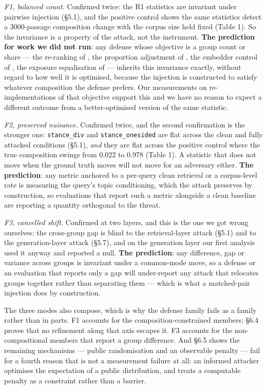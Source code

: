 \documentclass[authoryear,review,3p,times]{elsarticle}
\begin{document}
\emph{F1, balanced count.} Confirmed twice: the R1 statistics are invariant under pairwise injection (§5.1), and the positive control shows the same statistics detect a 3000-passage composition change with the corpus size held fixed (Table 1). So the invariance is a property of the attack, not the instrument. \textbf{The prediction for work we did not run}: any defense whose objective is a group count or share --- the re-ranking of \citeauthor{zhao2026}, the proportion adjustment of \citeauthor{wu2025}, the embedder control of \citeauthor{kim2025a}, the exposure equalisation of \citeauthor{kim2025b} --- inherits this invariance exactly, without regard to how well it is optimised, because the injection is constructed to satisfy whatever composition the defense prefers. Our measurements on re-implementations of that objective support this and we have no reason to expect a different outcome from a better-optimised version of the same statistic.

\emph{F2, preserved nuisance.} Confirmed twice, and the second confirmation is the stronger one: \texttt{stance\_div} and \texttt{stance\_onesided} are flat across the clean and fully attacked conditions (§5.1), \emph{and} they are flat across the positive control where the true composition swings from 0.022 to 0.978 (Table 1). A statistic that does not move when the ground truth moves will not move for an adversary either. \textbf{The prediction}: any metric anchored to a per-query clean retrieval or a corpus-level rate is measuring the query's topic conditioning, which the attack preserves by construction, so evaluations that report such a metric alongside a clean baseline are reporting a quantity orthogonal to the threat.

\emph{F3, cancelled shift.} Confirmed at two layers, and this is the one we got wrong ourselves: the cross-group gap is blind to the retrieval-layer attack (§5.1) and to the generation-layer attack (§5.7), and on the generation layer our first analysis used it anyway and reported a null. \textbf{The prediction}: any difference, gap or variance across groups is invariant under a common-mode move, so a defense or an evaluation that reports only a gap will under-report any attack that relocates groups together rather than separating them --- which is what a matched-pair injection does by construction.

The three modes also compose, which is why the defense family fails as a family rather than in parts. F1 accounts for the composition-constrained members; §6.4 proves that no refinement along that axis escapes it. F3 accounts for the non-compositional members that report a group difference. And §6.5 shows the remaining mechanisms --- public randomisation and an observable penalty --- fail for a fourth reason that is not a measurement failure at all: an informed attacker optimises the expectation of a public distribution, and treats a computable penalty as a constraint rather than a barrier.
\end{document}

